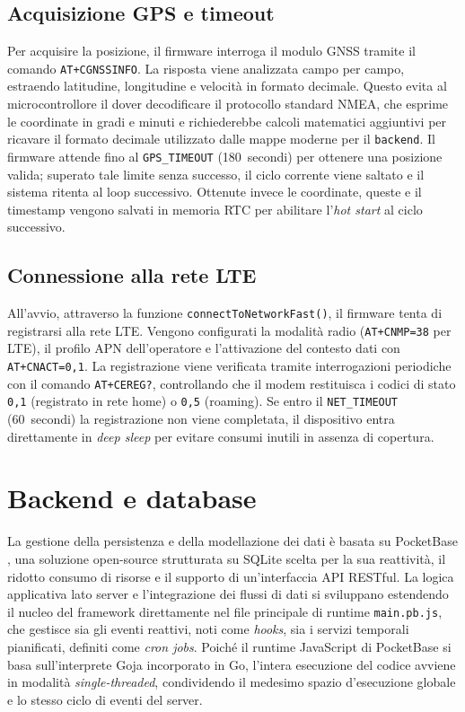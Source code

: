 \documentclass[12pt,a4paper]{article}
\begin{document}
\subsection{Acquisizione GPS e timeout}

Per acquisire la posizione, il firmware interroga il modulo GNSS tramite il comando \texttt{AT+CGNSSINFO}.
La risposta viene analizzata campo per campo, estraendo latitudine, longitudine e velocità in formato decimale. 
Questo evita al microcontrollore il dover decodificare il protocollo standard NMEA, 
che esprime le coordinate in gradi e minuti e richiederebbe calcoli matematici 
aggiuntivi per ricavare il formato decimale utilizzato dalle mappe moderne per il \texttt{backend}.
Il firmware attende fino al \texttt{GPS\_TIMEOUT} (180~secondi) per ottenere
una posizione valida; superato tale limite senza successo, il ciclo corrente viene
saltato e il sistema ritenta al loop successivo. Ottenute invece le coordinate, queste
e il timestamp vengono salvati in memoria RTC per abilitare l'\textit{hot start} al ciclo successivo.

\subsection{Connessione alla rete LTE}

All'avvio, attraverso la funzione \texttt{connectToNetworkFast()},
il firmware tenta di registrarsi alla rete LTE. Vengono configurati la modalità radio
(\texttt{AT+CNMP=38} per LTE), il profilo APN dell'operatore e l'attivazione del
contesto dati con \texttt{AT+CNACT=0,1}. La registrazione viene verificata tramite interrogazioni periodiche
con il comando \texttt{AT+CEREG?}, controllando che il modem restituisca i codici di stato
\texttt{0,1} (registrato in rete home) o \texttt{0,5} (roaming). Se entro il
\texttt{NET\_TIMEOUT} (60~secondi) la registrazione non viene completata, il dispositivo
entra direttamente in \textit{deep sleep} per evitare consumi inutili in assenza di copertura.

\section{Backend e database}

La gestione della persistenza e della modellazione dei dati è basata su PocketBase \cite{pocketbase},
una soluzione open-source strutturata su SQLite scelta per la sua reattività, 
il ridotto consumo di risorse e il supporto di un'interfaccia API RESTful. 
La logica applicativa lato server e l'integrazione dei flussi di dati si sviluppano estendendo 
il nucleo del framework direttamente nel file principale di runtime \texttt{main.pb.js}, 
che gestisce sia gli eventi reattivi, noti come \textit{hooks}, 
sia i servizi temporali pianificati, definiti come \textit{cron jobs}.
Poiché il runtime JavaScript di PocketBase si basa sull'interprete Goja incorporato in Go, 
l'intera esecuzione del codice avviene in modalità \textit{single-threaded}, 
condividendo il medesimo spazio d'esecuzione globale e lo stesso ciclo di eventi del server.
\end{document}
